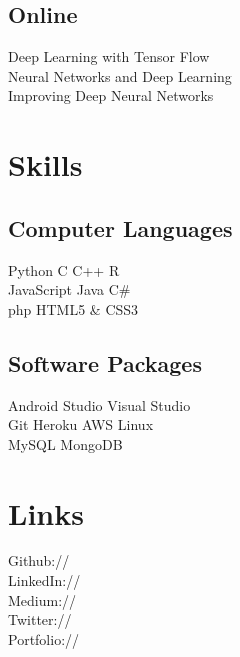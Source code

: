 \documentclass[]{deedy-resume-openfont}
\begin{document}
\begin{minipage}[t]{0.33\textwidth}
\subsection{Online}
Deep Learning with Tensor Flow \\
Neural Networks and Deep Learning \\
Improving Deep Neural Networks \\



\sectionsep



\section{Skills}
\subsection{Computer Languages}
Python \textbullet{}   C \textbullet{} C++ \textbullet{} R \\
JavaScript \textbullet{} Java \textbullet{} C\#  \\
php \textbullet{} HTML5 \& CSS3 \\
\sectionsep
\subsection{Software Packages}
Android Studio \textbullet{}   Visual Studio \\
Git \textbullet{} Heroku \textbullet{} AWS \textbullet{} Linux\\ 
MySQL \textbullet{} MongoDB\\

\sectionsep

\section{Links} 
Github:// \href{https://github.com/someshchaturvedi}{} \\
LinkedIn://  \href{https://www.linkedin.com/in/somesh-chaturvedi-997974103/}{} \\
Medium://  \href{https://medium.com/@somesh.08.96}{} \\
Twitter://  \href{https://twitter.com/somesh0896}{} \\
Portfolio://  \href{https:someshchaturvedi.in}{}
\sectionsep


\end{minipage}
\end{document}
